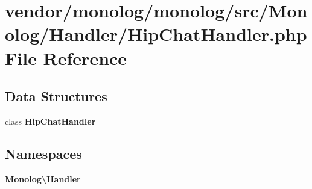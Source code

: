 \section{vendor/monolog/monolog/src/\+Monolog/\+Handler/\+Hip\+Chat\+Handler.php File Reference}
\label{_hip_chat_handler_8php}
\subsection*{Data Structures}
\begin{DoxyCompactItemize}
\item 
class {\bf Hip\+Chat\+Handler}
\end{DoxyCompactItemize}
\subsection*{Namespaces}
\begin{DoxyCompactItemize}
\item 
 {\bf Monolog\textbackslash{}\+Handler}
\end{DoxyCompactItemize}

